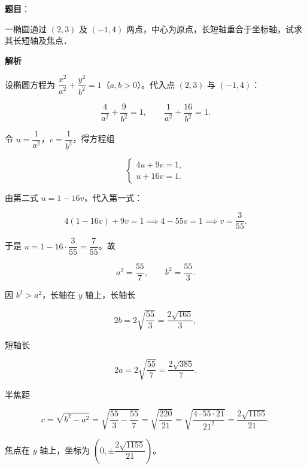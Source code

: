 \begin{answer}

\textbf{题目}：

一椭圆通过 $(2,3)$ 及 $(-1,4)$ 两点，中心为原点，长短轴重合于坐标轴，试求其长短轴及焦点．

\textbf{解析}

设椭圆方程为 $\dfrac{x^2}{a^2}+\dfrac{y^2}{b^2}=1$（$a,b>0$）。代入点 $(2,3)$ 与 $(-1,4)$：

\nopagebreak[4]
\[
\dfrac{4}{a^2}+\dfrac{9}{b^2}=1,\qquad \dfrac{1}{a^2}+\dfrac{16}{b^2}=1.
\]

令 $u=\dfrac1{a^2}$，$v=\dfrac1{b^2}$，得方程组

\nopagebreak[4]
\[
\begin{cases}
4u+9v=1,\\
u+16v=1.
\end{cases}
\]

由第二式 $u=1-16v$，代入第一式：

\nopagebreak[4]
\[
4(1-16v)+9v=1
\implies 4-55v=1
\implies v=\dfrac3{55}.
\]

于是 $u=1-16\cdot\dfrac3{55}=\dfrac7{55}$。故

\nopagebreak[4]
\[
a^2=\dfrac{55}{7},\qquad b^2=\dfrac{55}{3}.
\]

因 $b^2>a^2$，长轴在 $y$ 轴上，长轴长

\nopagebreak[4]
\[
2b=2\sqrt{\dfrac{55}{3}}=\dfrac{2\sqrt{165}}{3},
\]

短轴长

\nopagebreak[4]
\[
2a=2\sqrt{\dfrac{55}{7}}=\dfrac{2\sqrt{385}}{7}.
\]

半焦距

\nopagebreak[4]
\[
c=\sqrt{b^2-a^2}=\sqrt{\dfrac{55}{3}-\dfrac{55}{7}}=\sqrt{\dfrac{220}{21}}=\sqrt{\dfrac{4\cdot55\cdot21}{21^2}}=\dfrac{2\sqrt{1155}}{21}.
\]

焦点在 $y$ 轴上，坐标为 $\left(0,\pm\dfrac{2\sqrt{1155}}{21}\right)$。


\end{answer}